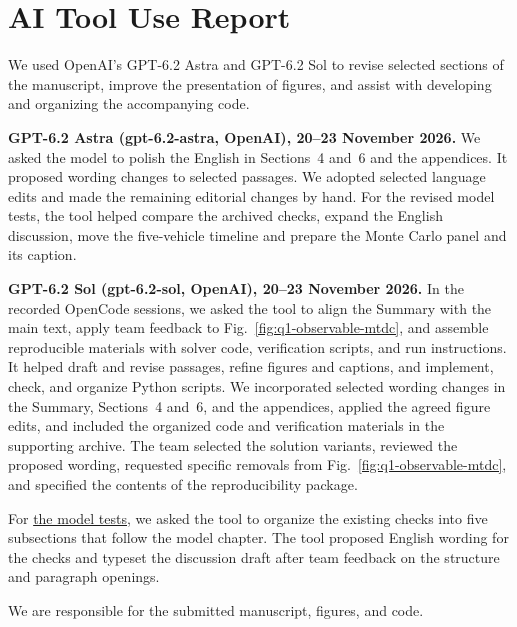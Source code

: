 \documentclass{swmcmthesis}
\begin{document}
\clearpage
\section*{AI Tool Use Report}

We used OpenAI's GPT-6.2 Astra and GPT-6.2 Sol to revise selected sections of the manuscript, improve the presentation of figures, and assist with developing and organizing the accompanying code.

\noindent\textbf{GPT-6.2 Astra (gpt-6.2-astra, OpenAI), 20--23 November 2026.}
We asked the model to polish the English in Sections~4 and~6 and the appendices. It proposed wording changes to selected passages. We adopted selected language edits and made the remaining editorial changes by hand.
For the revised model tests, the tool helped compare the archived checks, expand the English discussion, move the five-vehicle timeline and prepare the Monte Carlo panel and its caption.

\noindent\textbf{GPT-6.2 Sol (gpt-6.2-sol, OpenAI), 20--23 November 2026.}
In the recorded OpenCode sessions, we asked the tool to align the Summary with the main text, apply team feedback to Fig.~\ref{fig:q1-observable-mtdc}, and assemble reproducible materials with solver code, verification scripts, and run instructions. It helped draft and revise passages, refine figures and captions, and implement, check, and organize Python scripts. We incorporated selected wording changes in the Summary, Sections~4 and~6, and the appendices, applied the agreed figure edits, and included the organized code and verification materials in the supporting archive. The team selected the solution variants, reviewed the proposed wording, requested specific removals from Fig.~\ref{fig:q1-observable-mtdc}, and specified the contents of the reproducibility package.

For \hyperref[sec:model-tests]{the model tests}, we asked the tool to organize the existing checks into five subsections that follow the model chapter. The tool proposed English wording for the checks and typeset the discussion draft after team feedback on the structure and paragraph openings.

We are responsible for the submitted manuscript, figures, and code.


\clearpage
\endgroup
\end{document}
